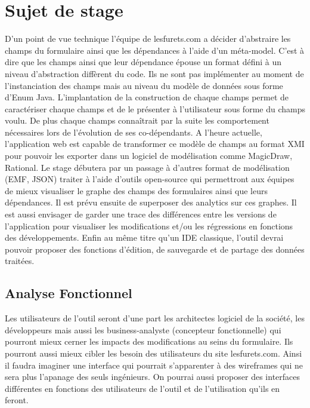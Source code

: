 \chapter{Sujet de stage}
D’un point de vue technique l’équipe de lesfurets.com a décider d’abstraire les champs du formulaire ainsi que les dépendances à l’aide d'un méta-model. C'est à dire que les champs ainsi que leur dépendance épouse un format défini à un niveau d'abstraction diffèrent du code. Ils ne sont pas implémenter au moment de l'instanciation des champs mais au niveau du modèle de données sous forme d'Enum Java. L'implantation de la construction de chaque champs permet de caractériser chaque champs et de le présenter à l'utilisateur sous forme du champs voulu. De plus chaque champs connaîtrait par la suite les comportement nécessaires lors de l'évolution de ses co-dépendants.  A l’heure actuelle, l’application web est capable de transformer ce modèle de champs au format XMI pour pouvoir les exporter dans un logiciel de modélisation comme MagicDraw, Rational. Le stage débutera par un passage à d’autres format de modélisation (EMF, JSON) traiter à l'aide d'outils open-source qui permettront aux équipes de mieux visualiser le graphe des champs des formulaires ainsi que leurs dépendances. Il est prévu ensuite de superposer des analytics sur ces graphes. Il est aussi envisager de garder une trace des différences entre les versions de l’application pour visualiser les modifications et/ou les régressions en fonctions des développements. Enfin au même titre qu’un IDE classique, l’outil devrai pouvoir proposer des fonctions d’édition, de sauvegarde et de partage des données traitées.

\section{Analyse Fonctionnel}
Les utilisateurs de l’outil seront d’une part les architectes logiciel de la société, les développeurs mais aussi les business-analyste (concepteur fonctionnelle) qui pourront mieux cerner les impacts des modifications au seins du formulaire. Ils pourront aussi mieux cibler les besoin des utilisateurs du site lesfurets.com. Ainsi il faudra imaginer une interface qui pourrait s'apparenter à des wireframes qui ne sera plus l’apanage des seuls ingénieurs. On pourrai aussi proposer des interfaces différentes en fonctions des utilisateurs de l'outil et de l'utilisation qu'ils en feront.

